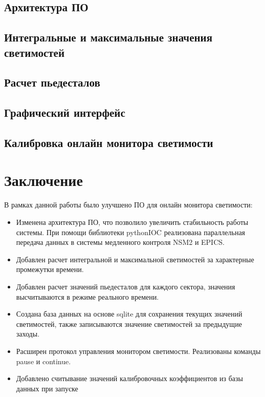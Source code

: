 \documentclass[a4paper, 12pt]{article}
\begin{document}
    \subsection{Архитектура ПО}
    
    \subsection{Интегральные и максимальные значения светимостей}
    
    \subsection{Расчет пьедесталов}
    
    \subsection{Графический интерфейс}
    
    \subsection{Калибровка онлайн монитора светимости}
    
\section*{Заключение}
    В рамках данной работы было улучшено ПО для онлайн монитора светимости:
    \begin{itemize}
        \item Изменена архитектура ПО, что позволило увеличить стабильность работы системы. При помощи библиотеки pythonIOC реализована параллельная передача данных в системы медленного контроля NSM2 и EPICS.
        \item Добавлен расчет интегральной и максимальной светимостей за характерные промежутки времени.
        \item Добавлен расчет значений пьедесталов для каждого сектора, значения высчитываются в режиме реального времени.
        \item Создана база данных на основе sqlite для сохранения текущих значений светимостей, также записываются значение светимостей за предыдущие заходы.
        \item Расширен протокол управления монитором светимости. Реализованы команды pause и continue.
        \item Добавлено считывание значений калибровочных коэффициентов из базы данных при запуске
    \end{itemize}
    
\end{document}
